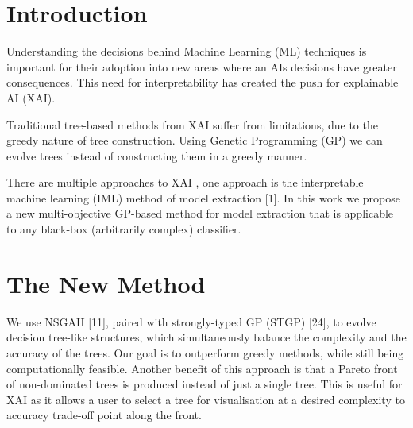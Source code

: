 \section{Introduction} 
Understanding the decisions behind Machine Learning (ML) techniques is important for their adoption into new areas where an AI\textquotesingle s decisions have greater consequences. This need for interpretability has created the push for explainable AI (XAI).


Traditional tree-based methods from XAI suffer from limitations, due to the greedy nature of tree construction. Using Genetic Programming (GP) \cite{Koza:GeneticProgramming} we can evolve trees instead of constructing them in a greedy manner.

There are multiple approaches to XAI \cite{Karlo:xai}, one approach is the interpretable machine learning (IML) method of model extraction [1]. In this work we propose a new multi-objective GP-based method for model extraction that is applicable to any black-box (arbitrarily complex) classifier.

\section{The New Method}
We use NSGAII [11], paired with strongly-typed GP (STGP) [24], to evolve decision tree-like structures, which simultaneously balance the complexity and the accuracy of the trees. Our goal is to outperform greedy methods, while still being computationally feasible. Another benefit of this approach is that a Pareto front of non-dominated trees is produced instead of just a single tree. This is useful for XAI as it allows a user to select a tree for visualisation at a desired complexity to accuracy trade-off point along the front.
